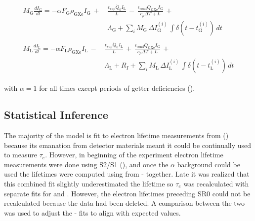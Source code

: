 \vspace{-20pt}

\begin{subequations}
\begin{align}
\begin{split}
M_{\mathrm{G}} \frac{dI_{\mathrm{G}}}{dt} = - \alpha F_{\mathrm{G}} \rho_{\mathrm{GXe}} I_{\mathrm{G}}\, + \,
& \frac{\epsilon_{\mathrm{vap}} \dot{Q}_0 I_{\mathrm{L}}}{L}\, - \,
\frac{\epsilon_{\mathrm{cond}} \dot{Q}_{\mathrm{GXe}} I_{\mathrm{G}}}{c_p \Delta T + L}\, + \\
& \Lambda_{\mathrm{G}} + \sum_i  M_{\mathrm{G}}\, \Delta I_{\mathrm{G}}^{(i)}\, \int \delta (t - t_{\mathrm{G}}^{(i)})\, dt
\end{split}
\\
\begin{split}
M_{\mathrm{L}} \frac{dI_{\mathrm{L}}}{dt} = -\alpha F_{\mathrm{L}} \rho_{\mathrm{GXe}} I_{\mathrm{L}}\, - \,
& \frac{\epsilon_{\mathrm{vap}} \dot{Q}_0 I_{\mathrm{L}}}{L}\, + \,
\frac{\epsilon_{\mathrm{cond}} \dot{Q}_{\mathrm{GXe}} I_{\mathrm{G}}}{c_p \Delta T + L}\, + \\
& \Lambda_{\mathrm{L}} + R_I + \sum_i  M_{\mathrm{L}}\, \Delta I_{\mathrm{L}}^{(i)}\, \int \delta (t - t_{\mathrm{L}}^{(i)})\, dt
\end{split}
\end{align}
\label{eq:elifetime_fit_model}
\end{subequations}

\vspace{-15pt}

\noindent with $\alpha = 1$ for all times except periods of getter deficiencies
().



\subsection{Statistical Inference}
\label{subsec:elifetime_fit_likelihood}
The majority of the model is fit to electron lifetime measurements from 
() because its emanation from
detector materials meant it could be continually used to measure $\tau_e$.  However, in beginning of the
experiment electron lifetime measurements were done using S2/S1 (), and once the $\alpha$
background could be used the lifetimes were computed using \alphadecays from - together.  Late it was realized
that this combined
fit slightly underestimated the lifetime so $\tau_e$ was recalculated with separate fits for  and .  However,
the electron lifetimes preceding SR0 could not be recalculated because the data had been deleted.  A comparison between the two was used
to adjust the - fits to align with expected values.

